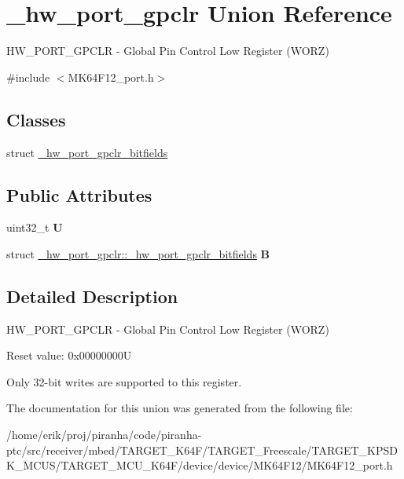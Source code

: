 \hypertarget{union__hw__port__gpclr}{}\section{\+\_\+hw\+\_\+port\+\_\+gpclr Union Reference}
\label{union__hw__port__gpclr}


H\+W\+\_\+\+P\+O\+R\+T\+\_\+\+G\+P\+C\+LR -\/ Global Pin Control Low Register (W\+O\+RZ)  




{\ttfamily \#include $<$M\+K64\+F12\+\_\+port.\+h$>$}

\subsection*{Classes}
\begin{DoxyCompactItemize}
\item 
struct \hyperlink{struct__hw__port__gpclr_1_1__hw__port__gpclr__bitfields}{\+\_\+hw\+\_\+port\+\_\+gpclr\+\_\+bitfields}
\end{DoxyCompactItemize}
\subsection*{Public Attributes}
\begin{DoxyCompactItemize}
\item 
uint32\+\_\+t {\bfseries U}\hypertarget{union__hw__port__gpclr_a220a91ff6bb5f048d79369828e0e5e87}{}\label{union__hw__port__gpclr_a220a91ff6bb5f048d79369828e0e5e87}

\item 
struct \hyperlink{struct__hw__port__gpclr_1_1__hw__port__gpclr__bitfields}{\+\_\+hw\+\_\+port\+\_\+gpclr\+::\+\_\+hw\+\_\+port\+\_\+gpclr\+\_\+bitfields} {\bfseries B}\hypertarget{union__hw__port__gpclr_aca5c381d81178c17182b870235e02a34}{}\label{union__hw__port__gpclr_aca5c381d81178c17182b870235e02a34}

\end{DoxyCompactItemize}


\subsection{Detailed Description}
H\+W\+\_\+\+P\+O\+R\+T\+\_\+\+G\+P\+C\+LR -\/ Global Pin Control Low Register (W\+O\+RZ) 

Reset value\+: 0x00000000U

Only 32-\/bit writes are supported to this register. 

The documentation for this union was generated from the following file\+:\begin{DoxyCompactItemize}
\item 
/home/erik/proj/piranha/code/piranha-\/ptc/src/receiver/mbed/\+T\+A\+R\+G\+E\+T\+\_\+\+K64\+F/\+T\+A\+R\+G\+E\+T\+\_\+\+Freescale/\+T\+A\+R\+G\+E\+T\+\_\+\+K\+P\+S\+D\+K\+\_\+\+M\+C\+U\+S/\+T\+A\+R\+G\+E\+T\+\_\+\+M\+C\+U\+\_\+\+K64\+F/device/device/\+M\+K64\+F12/M\+K64\+F12\+\_\+port.\+h\end{DoxyCompactItemize}
